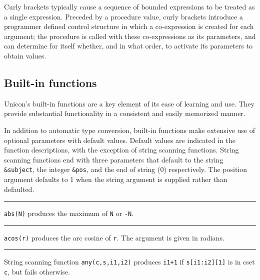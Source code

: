 \noindent
Curly brackets typically cause a sequence
of bounded expressions to be treated as a single expression. Preceded
by a procedure value, curly brackets introduce a programmer defined
control structure in which a co-expression is created for each
argument; the procedure is called with these co-expressions as its
parameters, and can determine for itself whether, and in what order, to
activate its parameters to obtain values.

\subsection*{Built-in functions}

Unicon's built-in functions
are a key element of its ease of learning and use. They provide
substantial functionality in a consistent and easily memorized manner.

In addition to automatic type conversion, built-in functions make
extensive use of optional parameters with default values. Default
values are indicated in the function descriptions, with the exception
of string scanning functions.
String scanning
functions end with three parameters that
default to the string \texttt{\&subject}, the integer \texttt{\&pos},
and the end of string (0) respectively. The position argument defaults
to 1 when the string argument is supplied rather than defaulted.

\bigskip

\hrule\vspace{0.1cm}

\noindent {}\texttt{abs(N)} produces the maximum of
\texttt{N} or \texttt{{}-N}.

\bigskip

\hrule\vspace{0.1cm}

\noindent
{}\texttt{acos(r)} produces the arc cosine of
\texttt{r}. The argument is given in radians.

\bigskip

\hrule\vspace{0.1cm}

\noindent
{}String scanning function
\texttt{any(c,s,i1,i2)} produces \texttt{i1+1} if \texttt{s[i1:i2][1]}
is in cset \texttt{c}, but fails otherwise.

